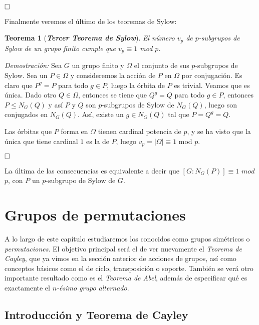 \documentclass[12pt]{article}
\newtheorem{theorem}{Teorema}[section]
\begin{document}
$\hfill \square$

Finalmente veremos el último de los teoremas de Sylow:

\begin{theorem}[\textit{\textbf{Tercer Teorema de Sylow}}]
El número $v_{p}$ de $p$-subgrupos de Sylow de un grupo finito cumple que $v_{p} \equiv 1$ mod $p$.
\end{theorem}
\emph{Demostración: }Sea $G$ un grupo finito y $\Omega$ el conjunto de sus $p$-subgrupos de Sylow. Sea un $P \in \Omega$ y consideremos la acción de $P$ en $\Omega$ por conjugación. Es claro que $P^{g}=P$ para todo $g \in P$, luego la órbita de $P$ es trivial. Veamos que es única. Dado otro $Q \in \Omega$, entonces se tiene que $Q^{g} = Q$ para todo $g \in P$, entonces $P \leq N_{G}(Q)$ y así $P$ y $Q$ son $p$-subgrupos de Sylow de $N_{G}(Q)$, luego son conjugados en $N_{G}(Q)$. Así, existe un $g \in N_{G}(Q)$ tal que $P = Q^{g}= Q$.

Las órbitas que $P$ forma en $\Omega$ tienen cardinal potencia de $p$, y se ha visto que la única que tiene cardinal $1$ es la de $P$, luego $v_{p}=|\Omega| \equiv 1$ mod $p$.

$\hfill \square$

La última de las consecuencias es equivalente a decir que $\left[ G:N_{G}(P) \right] \equiv 1$ $mod$ $p$, con $P$ un $p$-subgrupo de Sylow de $G$.

\section{Grupos de permutaciones}

A lo largo de este capítulo estudiaremos los conocidos como grupos simétricos o \textit{permutaciones}. El objetivo principal será el de ver nuevamente el \textit{Teorema de Cayley}, que ya vimos en la sección anterior de acciones de grupos, así como conceptos básicos como el de ciclo, transposición o soporte. También se verá otro importante resultado como es el \textit{Teorema de Abel}, además de especificar qué es exactamente el \textit{$n$-ésimo grupo alternado}.

\subsection{Introducción y Teorema de Cayley}
\end{document}

